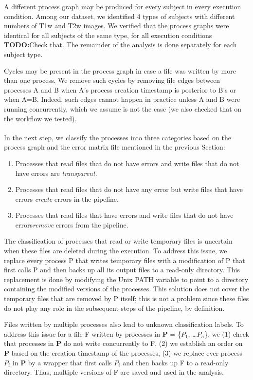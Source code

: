 \documentclass{article}
\newcommand{\todo}[1]{\color{red}\textbf{TODO:}#1\color{black}}
\begin{document}
A different process graph may be produced for every subject in every
execution condition. Among our dataset, we identified 4 types of
subjects with different numbers of T1w and T2w images. We verified
that the process graphs were identical for all subjects of the same
type, for all execution conditions \todo{Check that}. The remainder of
the analysis is done separately for each subject type.

Cycles may be present in the process graph in case a file was written 
by more than one process. We remove such cycles by removing file edges 
between processes A and B when A's process creation timestamp is 
posterior to B's or when A=B. Indeed, such edges cannot happen in 
practice unless A and B were running concurrently, which we assume is 
not the case (we also checked that on the workflow we tested). 

\paragraph{} In the next step, we classify the processes into three 
categories based on the process graph and the error matrix file 
mentioned in the previous Section:
\begin{enumerate}
\item Processes 
that read files that do not have errors and write files that do not 
have errors are \emph{transparent}.
\item Processes that read files 
that do not have any error but write files that have errors 
\emph{create} errors in the pipeline.
\item Processes that read files 
that have errors and write files that do not have errors\emph{remove} 
errors from the pipeline.
\end{enumerate}

The classification of processes that read or write temporary files is 
uncertain when these files are deleted during the execution. To address 
this issue, we replace every process P that writes temporary files with 
a modification of P that first calls P and then backs up all its output 
files to a read-only directory. This replacement is done by modifying 
the Unix PATH variable to point to a directory containing the modified
versions of the processes. This solution does not cover the temporary files
that are removed by P itself; this is not a problem since these files do not
play any role in the subsequent steps of the pipeline, by definition.

Files written by multiple processes also lead to unknown classification 
labels. To address this issue for a file F written by processes in 
\textbf{P} = \{$P_{1}$, \ldots $P_{n}$\}, we (1) check that processes 
in \textbf{P} do not write concurrently to F, (2) we establish an order 
on \textbf{P} based on the creation timestamp of the processes, (3) we 
replace ever process $P_{i}$ in \textbf{P} by a wrapper that first 
calls $P_{i}$ and then backs up F to a read-only directory. Thus, 
multiple versions of F are saved and used in the analysis.
\end{document}
